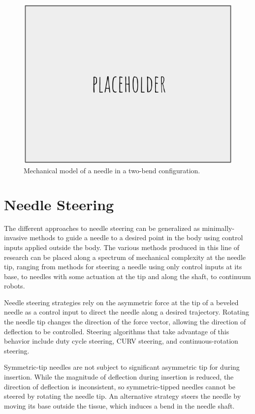 \begin{figure}[h]
\includegraphics[width=1.0\textwidth]{Fig/placeholder.png}
\caption{Mechanical model of a needle in a two-bend configuration\cite{roesthuis_mechanics-based_2012}.}
\label{fig:needle_mech_model}
\end{figure}


\section{Needle Steering}

The different approaches to needle steering can be generalized as minimally-invasive methods to guide a needle to a desired point in the body using control inputs applied outside the body. The various methods produced in this line of research can be placed along a spectrum of mechanical complexity at the needle tip, ranging from methods for steering a needle using only control inputs at its base, to needles with some actuation at the tip and along the shaft, to continuum robots. 

Needle steering strategies rely on the asymmetric force at the tip of a beveled needle as a control input to direct the needle along a desired trajectory. Rotating the needle tip changes the direction of the force vector, allowing the direction of deflection to be controlled. Steering algorithms that take advantage of this behavior include duty cycle steering, CURV steering, and continuous-rotation steering.

Symmetric-tip needles are not subject to significant asymmetric tip for during insertion\cite{dimaio_needle_2003}. While the magnitude of deflection during insertion is reduced, the direction of deflection is inconsistent, so symmetric-tipped needles cannot be steered by rotating the needle tip. An alternative strategy steers the needle by moving its base outside the tissue, which induces a bend in the needle shaft\cite{glozman_image-guided_2007}.

